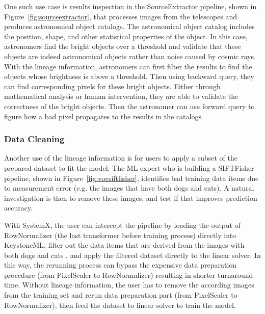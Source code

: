 \documentclass{sig-alternate}
\begin{document}
One such use case is results inspection in the SourceExtractor pipeline, shown in Figure~\ref{fig:sourceextractor},
that processes images from the telescopes and produces astronomical object catalogs. 
The astronomical object catalog includes the position, shape, and other statistical properties of the object.
In this case, astronomers find the bright objects over a threshold and validate that these objects are indeed astronomical objects rather
than noise caused by cosmic rays.
With the lineage information, astronomers can first filter the results to find the objects whose brightness is above a threshold.
Then using backward query, they can find corresponding pixels for these bright objects. 
Either through mathematical analysis or human intervention, they are able to validate the correctness of the bright objects.
Then the astronomer can use forward query to figure how a bad pixel propagates to the results in the catalogs.

\subsubsection{Data Cleaning}
\label{sec:Back-Case-Cleaning}
Another use of the lineage information is for users to apply a subset of the prepared dataset to fit the model. 
The ML expert who is building a SIFTFisher pipeline, shown in Figure~\ref{fig:vocsiftfisher}, identifies bad 
training data items due to measurement error (e.g. the images that have both dogs and cats). A natural 
investigation is then to remove these images, and test if that improves prediction accuracy.

With SystemX, the user can intercept the pipeline by loading the output of RowNormalizer (the last transformer before training process) 
directly into KeystoneML, filter out the data items that are derived from the images with both dogs and cats , 
and apply the filtered dataset directly to the linear solver.
In this way, the rerunning process can bypass the expensive data preparation procedure (from PixelScaler to RowNormalizer) 
resulting in shorter turnaround time.
Without lineage information, the user has to remove the according images from the training set and rerun data
preparation part (from PixelScaler to RowNormalizer), then feed the dataset to linear solver to train the model.
\end{document}
